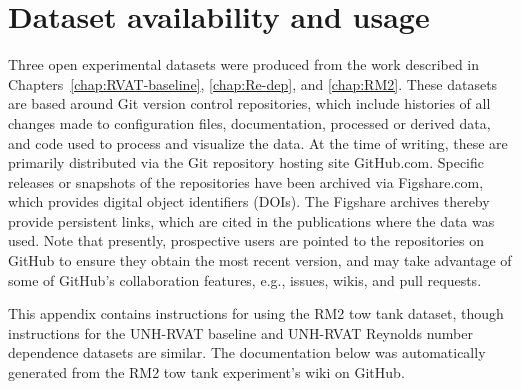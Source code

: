 \chapter{Dataset availability and usage}
\doublespace

Three open experimental datasets were produced from the work described in
Chapters~\ref{chap:RVAT-baseline}, \ref{chap:Re-dep}, and \ref{chap:RM2}. These
datasets are based around Git version control repositories, which include
histories of all changes made to configuration files, documentation, processed
or derived data, and code used to process and visualize the data. At the time of
writing, these are primarily distributed via the Git repository hosting site
GitHub.com. Specific releases or snapshots of the repositories have been
archived via Figshare.com, which provides digital object identifiers (DOIs). The
Figshare archives thereby provide persistent links, which are cited in the
publications where the data was used. Note that presently, prospective users are
pointed to the repositories on GitHub to ensure they obtain the most recent
version, and may take advantage of some of GitHub's collaboration features,
e.g., issues, wikis, and pull requests.

This appendix contains instructions for using the RM2 tow tank dataset, though
instructions for the UNH-RVAT baseline and UNH-RVAT Reynolds number dependence
datasets are similar. The documentation below was automatically generated from
the RM2 tow tank experiment's wiki on GitHub.



